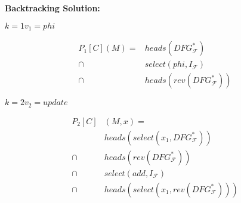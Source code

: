 \vspace{1cm}
\begin{minipage}[t]{6cm}
    \centering
    {\Large\bf Backtracking Solution:}

    $k=1$\quad$v_1=phi$
    \begin{graybox}
        \setlength{\abovedisplayskip}{0pt}
        \setlength{\belowdisplayskip}{0pt}
        \vspace{-0.5em}
        \begin{align*}
            P_1[C](M)={}&heads(DFG_\mathcal{F}^*)\\
                \mathrel\cap{}&select(phi,I_\mathcal{F})\\
                \mathrel\cap{}&heads(rev(DFG_\mathcal{F}^*))
        \end{align*}
    \end{graybox}
    \vspace{-0.75em}
    \hspace{0.3cm}
    \hspace{0.3cm}

    $k=2$\quad$v_2=update$
    \begin{graybox}
        \setlength{\abovedisplayskip}{0pt}
        \setlength{\belowdisplayskip}{0pt}
        \vspace{-0.5em}
        \begin{align*}
            P_2[C]&(M,x)=\\
                            {}&heads(select(x_1,DFG_\mathcal{F}^*))\\
                \mathrel\cap{}&heads(rev(DFG_\mathcal{F}^*))\\
                \mathrel\cap{}&select(add,I_\mathcal{F})\\
                \mathrel\cap{}&heads(select(x_1,rev(DFG_\mathcal{F}^*)))
        \end{align*}
    \end{graybox}
    \vspace{-0.75em}
    \hspace{0.3cm}
    \hspace{0.3cm}


\end{minipage}
